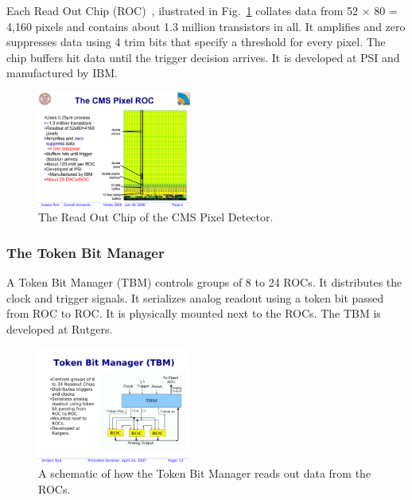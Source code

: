 Each Read Out Chip (ROC)~\cite{ROC}, ilustrated in Fig.~\ref{fig:ROC} collates data from 52 $\times$ 80 = 4,160 pixels 
and contains about 1.3 million transistors in all.
It amplifies and zero suppresses data using 4 trim bits
that specify a threshold for every pixel. The chip buffers hit data
until the trigger decision arrives. It is developed at PSI and manufactured by IBM.

\begin{figure}[h]
\begin{center}
 \includegraphics[width=0.45\textwidth]{ROC.pdf}
\end{center}
\caption{The Read Out Chip of the CMS Pixel Detector.}
\label{fig:ROC}
\end{figure}

\clearpage

\subsubsection{The Token Bit Manager}

A Token Bit Manager (TBM) controls groups of 8 to 24 ROCs.
It distributes the clock and trigger signals.
It serializes analog readout using a token bit 
passed from ROC to ROC. It is physically mounted next to the ROCs.
The TBM is developed at Rutgers.

\begin{figure}[h]
\begin{center}
 \includegraphics[width=0.45\textwidth]{TBM.pdf}
\end{center}
\caption{A schematic of how the Token Bit Manager reads out data from the ROCs.}
\label{fig:TBM}
\end{figure}

